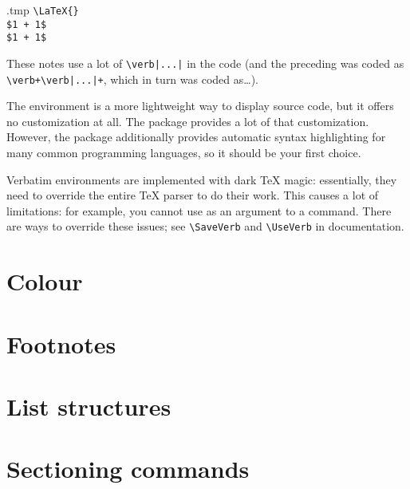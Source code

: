 \begin{VerbatimOut}{\jobname.tmp}
\verb+\LaTeX{}+ \\
\verb|$1 + 1$| \\
\verb*|$1 + 1$|
\end{VerbatimOut}
\ShowExample
%
These notes use a lot of \verb+\verb|...|+ in the code
(and the preceding was coded as
\verb!\verb+\verb|...|+!, which in turn was coded as\dots).

The  environment is a more lightweight way to display source code,
but it offers no customization at all.
The  package provides a lot of that customization.
However, the  package additionally provides automatic syntax highlighting
for many common programming languages, so it should be your first choice.

\begin{technote}
Verbatim environments are implemented with dark \TeX{} magic:
essentially, they need to override the entire \TeX{} parser to do their work.
This causes a lot of limitations:
for example, you cannot use  as an argument to a command.
There are ways to override these issues;
see \verb|\SaveVerb| and \verb|\UseVerb| in  documentation.
\end{technote}


%
%
%
\section{Colour}\label{sec:colour}


%
%
%
\section{Footnotes}



\section{List structures}



%
%
%
\section{Sectioning commands}


